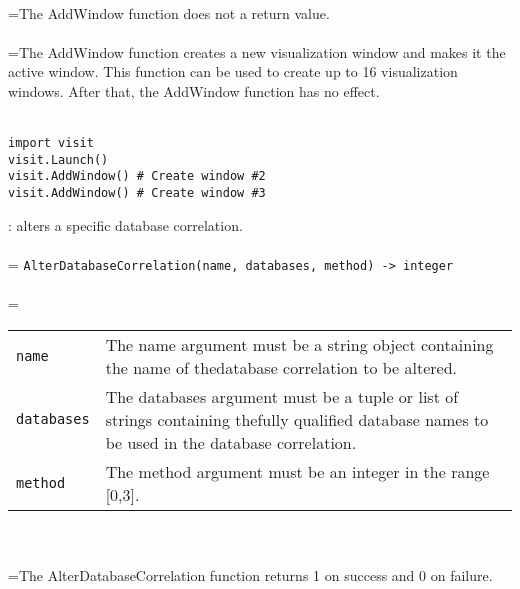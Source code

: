 \documentclass[10pt,a4paper]{report}
\begin{document}
 \\ 
\hangindent=\parindent The AddWindow function does not a return value. \\[-3mm] 

 \\ 
\hangindent=\parindent The AddWindow function creates a new visualization window and makes it the active window. This function can be used to create up to 16 visualization windows. After that, the AddWindow function has no effect. \\[-3mm] 

\\[-6mm]
\begin{verbatim}import visit
visit.Launch()
visit.AddWindow() # Create window #2
visit.AddWindow() # Create window #3
\end{verbatim}
\newpage


{}
: alters a specific database correlation.\\[-3mm]

 \\ 
\hangindent=\parindent 
\verb!AlterDatabaseCorrelation(name, databases, method) -> integer!\\ [-3mm]

 \\ 
\hangindent=\parindent 
\begin{tabular}{lp{9cm}}
\verb!name! & The name argument must be a string object containing the name of thedatabase correlation to be altered. \\
\verb!databases! & The databases argument must be a tuple or list of strings containing thefully qualified database names to be used in the database correlation. \\
\verb!method! & The method argument must be an integer in the range [0,3]. \\
\end{tabular} \\[-2mm]


 \\ 
\hangindent=\parindent The AlterDatabaseCorrelation function returns 1 on success and 0 on failure. \\[-3mm] 
\end{document}
